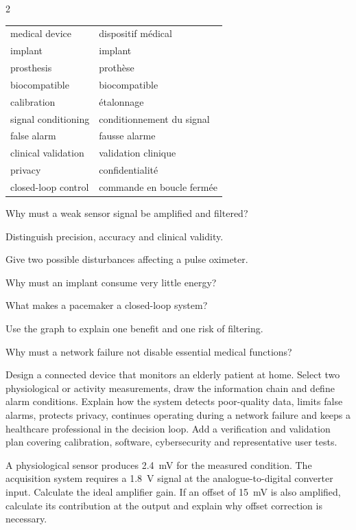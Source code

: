 \begin{multicols}{2}
\begin{vocabulary}
\begin{tabularx}{\linewidth}{@{}lX@{}}
medical device & dispositif médical\\
implant & implant\\
prosthesis & prothèse\\
biocompatible & biocompatible\\
calibration & étalonnage\\
signal conditioning & conditionnement du signal\\
false alarm & fausse alarme\\
clinical validation & validation clinique\\
privacy & confidentialité\\
closed-loop control & commande en boucle fermée
\end{tabularx}
\end{vocabulary}

\begin{questions}
\item Why must a weak sensor signal be amplified and filtered?
\item Distinguish precision, accuracy and clinical validity.
\item Give two possible disturbances affecting a pulse oximeter.
\item Why must an implant consume very little energy?
\item What makes a pacemaker a closed-loop system?
\item Use the graph to explain one benefit and one risk of filtering.
\item Why must a network failure not disable essential medical functions?
\end{questions}

\begin{engineeringchallenge}
Design a connected device that monitors an elderly patient at home. Select two physiological or activity measurements, draw the information chain and define alarm conditions. Explain how the system detects poor-quality data, limits false alarms, protects privacy, continues operating during a network failure and keeps a healthcare professional in the decision loop. Add a verification and validation plan covering calibration, software, cybersecurity and representative user tests.
\end{engineeringchallenge}

\begin{applicationexercise}
A physiological sensor produces 2.4~mV for the measured condition. The acquisition system requires a 1.8~V signal at the analogue-to-digital converter input. Calculate the ideal amplifier gain. If an offset of 15~mV is also amplified, calculate its contribution at the output and explain why offset correction is necessary.
\end{applicationexercise}


\end{multicols}
